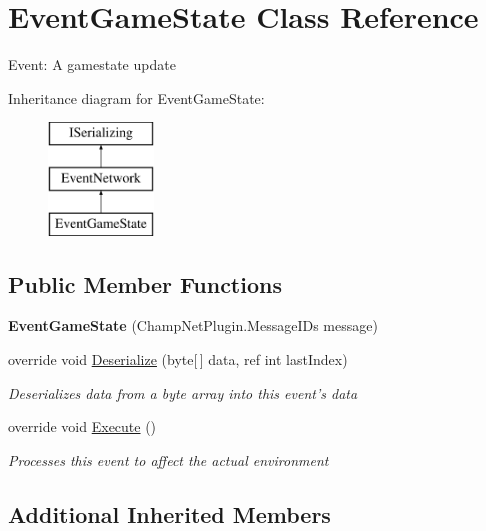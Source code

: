 \hypertarget{class_event_game_state}{\section{Event\-Game\-State Class Reference}
\label{class_event_game_state}
}


Event\-: A gamestate update  


Inheritance diagram for Event\-Game\-State\-:\begin{figure}[H]
\begin{center}
\leavevmode
\includegraphics[height=3.000000cm]{class_event_game_state}
\end{center}
\end{figure}
\subsection*{Public Member Functions}
\begin{DoxyCompactItemize}
\item 
\hypertarget{class_event_game_state_a34fd6692a15dabe770011dfe4d65057c}{{\bfseries Event\-Game\-State} (Champ\-Net\-Plugin.\-Message\-I\-Ds message)}\label{class_event_game_state_a34fd6692a15dabe770011dfe4d65057c}

\item 
override void \hyperlink{class_event_game_state_ac8d792c7dea5e0d703d317a66bcd4cdf}{Deserialize} (byte\mbox{[}$\,$\mbox{]} data, ref int last\-Index)
\begin{DoxyCompactList}\small\item\em Deserializes data from a byte array into this event's data \end{DoxyCompactList}\item 
override void \hyperlink{class_event_game_state_a9cf710bdb22c50a1e3af2615508861b6}{Execute} ()
\begin{DoxyCompactList}\small\item\em Processes this event to affect the actual environment \end{DoxyCompactList}\end{DoxyCompactItemize}
\subsection*{Additional Inherited Members}


